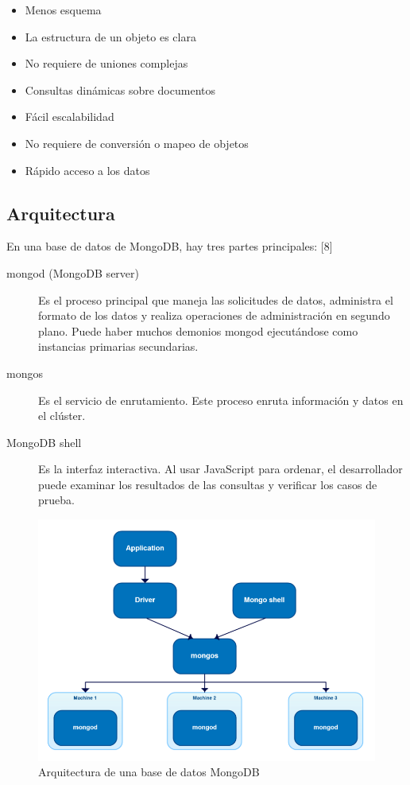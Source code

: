 \documentclass[twocolumn]{article}
\begin{document}
\begin{itemize}
  \item Menos esquema
  \item La estructura de un objeto es clara
  \item No requiere de uniones complejas
  \item Consultas dinámicas sobre documentos
  \item Fácil escalabilidad
  \item No requiere de conversión o mapeo de objetos
  \item Rápido acceso a los datos
\end{itemize}

\subsection{Arquitectura}

En una base de datos de MongoDB, hay tres partes principales: [8]

\begin{description}
  \item[mongod (MongoDB server)] Es el proceso principal que maneja las solicitudes de datos, administra el formato de los datos y realiza operaciones de administración en segundo plano. Puede haber muchos demonios mongod ejecutándose como instancias primarias secundarias.
  \item[mongos] Es el servicio de enrutamiento. Este proceso enruta información y datos en el clúster.
  \item[MongoDB shell] Es la interfaz interactiva. Al usar JavaScript para ordenar, el desarrollador puede examinar los resultados de las consultas y verificar los casos de prueba.
\end{description}

\begin{figure}[h]
  \includegraphics[width = \columnwidth]{img/01_mongo.png}
  \caption{Arquitectura de una base de datos MongoDB}
\end{figure}
\end{document}
